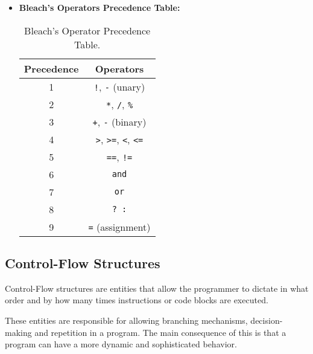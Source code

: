 \begin{itemize}
    \item \textbf{Bleach's Operators Precedence Table:}
        \begin{table}[H]
        \centering
        \begin{tabular}{|c|c|}
            \hline
            \textbf{Precedence} & \textbf{Operators} \\  %
            \hline
            1 & \texttt{!}, \texttt{-} (unary) \\  %
            \hline
            2 & \texttt{*}, \texttt{/}, \texttt{\%} \\
            \hline
            3 & \texttt{+}, \texttt{-} (binary) \\
            \hline
            4 & \texttt{>}, \texttt{>=}, \texttt{<}, \texttt{<=} \\
            \hline
            5 & \texttt{==}, \texttt{!=} \\
            \hline
            6 & \texttt{and} \\
            \hline
            7 & \texttt{or} \\
            \hline
            8 & \texttt{? :} \\
            \hline
            9 & \texttt{=} (assignment) \\
            \hline
        \end{tabular}
        \caption{Bleach's Operator Precedence Table.}
        \label{tab:example}
        \end{table}
\end{itemize}

\subsection{Control-Flow Structures}
Control-Flow structures are entities that allow the programmer to dictate in what order and by how many times instructions or code blocks are executed.

These entities are responsible for allowing branching mechanisms, decision-making and repetition in a program. The main consequence of this is that a program can have a more dynamic and sophisticated behavior.

